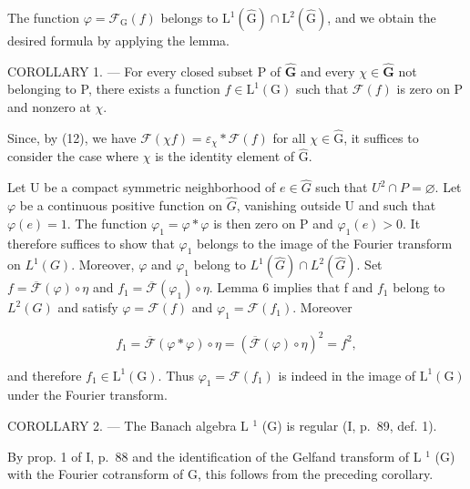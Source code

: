 The function \(\varphi = \mathcal{F}_{\mathrm{G}}(f)\) belongs to \(\mathrm{L}^1 (\widehat{\mathrm{G}})\cap \mathrm{L}^2 (\widehat{\mathrm{G}})\), and we obtain the desired formula by applying the lemma.

COROLLARY 1. --- For every closed subset P of \(\widehat{\mathbf{G}}\) and every \(\chi \in \widehat{\mathbf{G}}\) not belonging to P, there exists a function \(f \in \mathrm{L}^{1}(\mathrm{G})\) such that \(\mathcal{F}(f)\) is zero on P and nonzero at \(\chi\).

Since, by (12), we have \(\mathcal{F}(\chi f) = \varepsilon_{\chi} * \mathcal{F}(f)\) for all \(\chi \in \widehat{\mathrm{G}}\), it suffices to consider the case where \(\chi\) is the identity element of \(\widehat{\mathrm{G}}\).

Let U be a compact symmetric neighborhood of \(e \in \widehat{G}\) such that \(U^{2} \cap P = \varnothing\). Let \(\varphi\) be a continuous positive function on \(\widehat{G}\), vanishing outside U and such that \(\varphi(e) = 1\). The function \(\varphi_{1} = \varphi * \varphi\) is then zero on P and \(\varphi_{1}(e) > 0\). It therefore suffices to show that \(\varphi_{1}\) belongs to the image of the Fourier transform on \(L^{1}(G)\). Moreover, \(\varphi\) and \(\varphi_{1}\) belong to \(L^{1}(\widehat{G}) \cap L^{2}(\widehat{G})\). Set \(f = \overline{\mathcal{F}}(\varphi) \circ \eta\) and \(f_{1} = \overline{\mathcal{F}}(\varphi_{1}) \circ \eta\). Lemma 6 implies that f and \(f_{1}\) belong to \(L^{2}(G)\) and satisfy \(\varphi = \mathcal{F}(f)\) and \(\varphi_{1} = \mathcal{F}(f_{1})\). Moreover

\[
f _ {1} = \overline {{\mathcal {F}}} (\varphi * \varphi) \circ \eta = (\overline {{\mathcal {F}}} (\varphi) \circ \eta) ^ {2} = f ^ {2},
\]

and therefore \(f_{1} \in \mathrm{L}^{1}(\mathrm{G})\). Thus \(\varphi_{1} = \mathcal{F}(f_{1})\) is indeed in the image of \(\mathrm{L}^{1}(\mathrm{G})\) under the Fourier transform.

COROLLARY 2. --- The Banach algebra L \(^{1}\) (G) is regular (I, p.~89, def. 1).

By prop. 1 of I, p.~88 and the identification of the Gelfand transform of L \(^{1}\) (G) with the Fourier cotransform of G, this follows from the preceding corollary.
